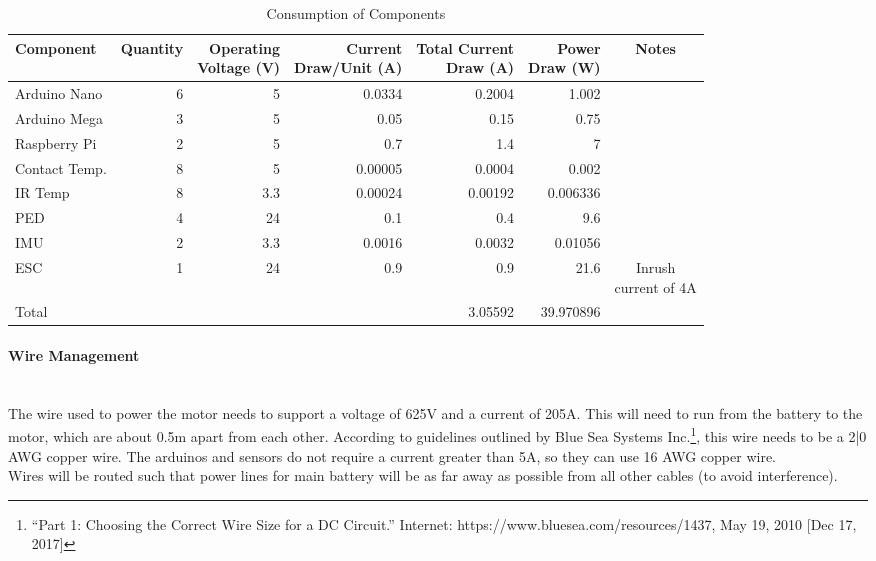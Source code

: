 \documentclass{report}
\let\oldparagraph\paragraph
\renewcommand{\paragraph}[1]{\oldparagraph{#1}\mbox{}\\}
\begin{document}
    \begin{table}[H]
        \centering
        \begin{tabular}{@{}lrrrrrc@{}} \toprule
            Component & Quantity & \makecell{Operating \\ Voltage (V)} & \makecell{Current \\ Draw/Unit (A)} & \makecell{Total Current \\ Draw (A)} & \makecell{Power \\ Draw (W)} & Notes\\ \midrule
            Arduino Nano & 6 & 5 & 0.0334 & 0.2004 & 1.002 &\\
            Arduino Mega & 3 & 5 & 0.05 & 0.15 & 0.75 &\\
            Raspberry Pi & 2 & 5 & 0.7 & 1.4 & 7 &\\
            Contact Temp. & 8 & 5 & 0.00005 & 0.0004 & 0.002 &\\
            IR Temp & 8 & 3.3 & 0.00024 & 0.00192 & 0.006336 &\\
            PED & 4 & 24 & 0.1 & 0.4 & 9.6 &\\
            IMU & 2 & 3.3 & 0.0016 & 0.0032 & 0.01056 &\\
            ESC & 1 & 24 & 0.9 & 0.9 & 21.6 & \makecell{Inrush \\ current of 4A}\\ \midrule
            Total & & & & 3.05592 & 39.970896 &\\ \bottomrule
        \end{tabular}
        \caption{Consumption of Components}
    \end{table}
    \paragraph{Wire Management}
    The wire used to power the motor needs to support a voltage of 625V and a current of 205A. This will need to run from the battery to the motor, which are about 0.5m apart from each other. According to guidelines outlined by Blue Sea Systems Inc.\footnote{“Part 1: Choosing the Correct Wire Size for a DC Circuit.” Internet: https://www.bluesea.com/resources/1437, May 19, 2010 [Dec 17, 2017]}, this wire needs to be a 2|0 AWG copper wire. The arduinos and sensors do not require a current greater than 5A, so they can use 16 AWG copper wire.\\
    
    Wires will be routed such that power lines for main battery will be as far away as possible from all other cables (to avoid interference).
    
\end{document}
